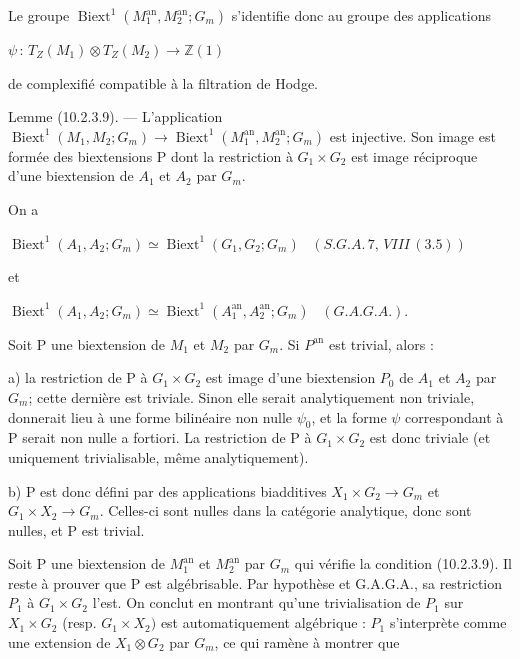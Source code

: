 \documentclass[11pt,twoside]{article}
\newcommand{\DFormula}[1]{%
  \par\smallskip\noindent\hspace*{0pt}\(\displaystyle #1\)\par\smallskip
}
\begin{document}
Le groupe \(\operatorname{Biext}^{1}(M_{1}^{\mathrm{an}},M_{2}^{\mathrm{an}};G_{m})\) s’identifie donc au groupe des applications\par
\par\medskip
\DFormula{\psi \,:\,T_{Z}(M_{1})\otimes T_{Z}(M_{2})\to \mathbb{Z}(1)}
\par\medskip
de complexifié compatible à la filtration de Hodge.\par
\par\medskip
Lemme (10.2.3.9). — L’application \(\operatorname{Biext}^{1}(M_{1},M_{2};G_{m})\to \operatorname{Biext}^{1}(M_{1}^{\mathrm{an}},M_{2}^{\mathrm{an}};G_{m})\) est injective. Son image est formée des biextensions P dont la restriction à \(G_{1}\times G_{2}\) est image réciproque d’une biextension de \(A_{1}\) et \(A_{2}\) par \(G_{m}\).\par
\par\medskip
On a\par
\par\medskip
\DFormula{\operatorname{Biext}^{1}(A_{1},A_{2};G_{m})\simeq \operatorname{Biext}^{1}(G_{1},G_{2};G_{m})\,\,\,\,\,(S.G.A.\,7,\,VIII\,(3.5))}
et\par
\DFormula{\operatorname{Biext}^{1}(A_{1},A_{2};G_{m})\simeq \operatorname{Biext}^{1}(A_{1}^{\mathrm{an}},A_{2}^{\mathrm{an}};G_{m})\,\,\,\,\,(G.A.G.A.).}
\par\medskip
Soit P une biextension de \(M_{1}\) et \(M_{2}\) par \(G_{m}\). Si \(P^{\mathrm{an}}\) est trivial, alors :\par
\par\medskip
a) la restriction de P à \(G_{1}\times G_{2}\) est image d’une biextension \(P_{0}\) de \(A_{1}\) et \(A_{2}\) par \(G_{m}\); cette dernière est triviale. Sinon elle serait analytiquement non triviale, donnerait lieu à une forme bilinéaire non nulle \(\psi _{0}\), et la forme \(\psi \) correspondant à P serait non nulle a fortiori. La restriction de P à \(G_{1}\times G_{2}\) est donc triviale (et uniquement trivialisable, même analytiquement).\par
\par\medskip
b) P est donc défini par des applications biadditives \(X_{1}\times G_{2}\to G_{m}\) et \(G_{1}\times X_{2}\to G_{m}\). Celles-ci sont nulles dans la catégorie analytique, donc sont nulles, et P est trivial.\par
\par\medskip
Soit P une biextension de \(M_{1}^{\mathrm{an}}\) et \(M_{2}^{\mathrm{an}}\) par \(G_{m}\) qui vérifie la condition (10.2.3.9). Il reste à prouver que P est algébrisable. Par hypothèse et G.A.G.A., sa restriction \(P_{1}\) à \(G_{1}\times G_{2}\) l’est. On conclut en montrant qu’une trivialisation de \(P_{1}\) sur \(X_{1}\times G_{2}\) (resp. \(G_{1}\times X_{2})\) est automatiquement algébrique : \(P_{1}\) s’interprète comme une extension de \(X_{1}\otimes G_{2}\) par \(G_{m}\), ce qui ramène à montrer que\par
\end{document}
